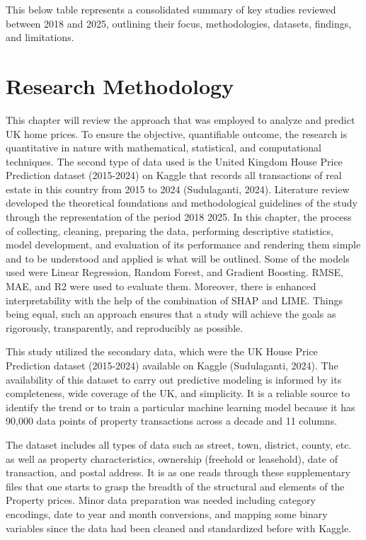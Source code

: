 \documentclass[12pt, a4paper, oneside]{book}
\begin{document}
This below table represents a consolidated summary of key studies reviewed between 2018 and 2025, outlining their focus, methodologies, datasets, findings, and limitations.

\chapter{Research Methodology}\label{ch:3}

This chapter will review the approach that was employed to analyze and predict UK home prices. To ensure the objective, quantifiable outcome, the research is quantitative in nature with mathematical, statistical, and computational techniques. The second type of data used is the United Kingdom House Price Prediction dataset (2015-2024) on Kaggle that records all transactions of real estate in this country from 2015 to 2024 (Sudulaganti, 2024). Literature review developed the theoretical foundations and methodological guidelines of the study through the representation of the period 2018 2025. In this chapter, the process of collecting, cleaning, preparing the data, performing descriptive statistics, model development, and evaluation of its performance and rendering them simple and to be understood and applied is what will be outlined. Some of the models used were Linear Regression, Random Forest, and Gradient Boosting. RMSE, MAE, and R2 were used to evaluate them. Moreover, there is enhanced interpretability with the help of the combination of SHAP and LIME. Things being equal, such an approach ensures that a study will achieve the goals as rigorously, transparently, and reproducibly as possible.


This study utilized the secondary data, which were the UK House Price Prediction dataset (2015-2024) available on Kaggle (Sudulaganti, 2024). The availability of this dataset to carry out predictive modeling is informed by its completeness, wide coverage of the UK, and simplicity. It is a reliable source to identify the trend or to train a particular machine learning model because it has 90,000 data points of property transactions across a decade and 11 columns.


The dataset includes all types of data such as street, town, district, county, etc. as well as property characteristics, ownership (freehold or leasehold), date of transaction, and postal address. It is as one reads through these supplementary files that one starts to grasp the breadth of the structural and elements of the Property prices. Minor data preparation was needed including category encodings, date to year and month conversions, and mapping some binary variables since the data had been cleaned and standardized before with Kaggle.
\end{document}
